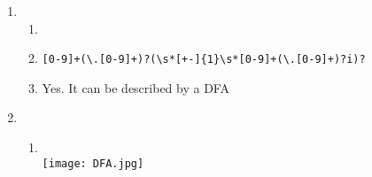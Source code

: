 \documentclass[a4paper]{article}
\date{}
\begin{document}
\thispagestyle{fancy}

\begin{enumerate}
    \item
    \begin{enumerate}
        \item

        \item
            \verb/[0-9]+(\.[0-9]+)?(\s*[+-]{1}\s*[0-9]+(\.[0-9]+)?i)?/
        \item
            Yes. It can be described by a DFA

    \end{enumerate}
\item
    \begin{enumerate}
        \item \text{}\\
            \texttt{[image: DFA.jpg]}
    \end{enumerate}
\end{enumerate}
\end{document}
